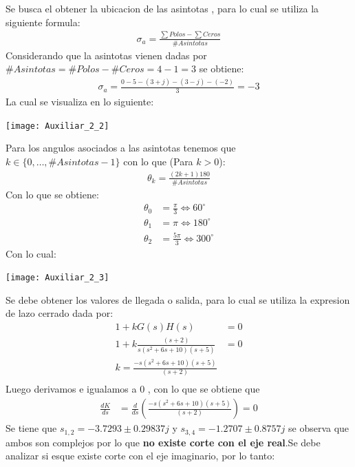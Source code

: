 \documentclass[
  11pt,
  letterpaper,
   addpoints,
  ]{exam}
\begin{document}
\begin{questions}
\begin{solution}
Se busca el obtener la ubicacion de las asintotas , para lo cual se utiliza la siguiente formula:
\begin{align}
    \sigma_{a}= \frac{\sum Polos - \sum Ceros}{\# Asintotas} 
\end{align}
Considerando que la asintotas vienen dadas por $\#Asintotas = \#Polos - \#Ceros = 4 - 1 = 3$ se obtiene:
\begin{align}
    \sigma_{a}= \frac{ 0 - 5 -(3 + j) - (3 - j) - (-2)}{3} = -3 
\end{align}
La cual se visualiza en lo siguiente:
\begin{center}
    \texttt{[image: Auxiliar\_2\_2]}
  \end{center}
Para los angulos asociados a las asintotas tenemos que $k \in \{0,\dots, \#Asintotas -1\}$ con lo que (Para $k>0$):
\begin{align}
    \theta_{k} = \frac{(2k+1)180}{\#Asintotas}
\end{align}
Con lo que se obtiene:
\begin{align}
    \theta_{0} &=  \frac{\pi}{3} \Leftrightarrow 60^{\circ} \\
    \theta_{1} &=  \pi \Leftrightarrow 180^{\circ} \\
    \theta_{2} &=  \frac{5\pi}{3} \Leftrightarrow 300^{\circ} 
\end{align}
Con lo cual:
\begin{center}
    \texttt{[image: Auxiliar\_2\_3]}
  \end{center}
Se debe obtener los valores de llegada o salida, para lo cual se utiliza la expresion de lazo cerrado dada por:
\begin{align}
    1+kG(s)H(s) &= 0\\
    1+ k\frac{(s+2)}{s(s^{2}+6s+10)(s+5)} &= 0\\
    k = \frac{-s(s^{2}+6s+10)(s+5)}{(s+2)}\\
\end{align}
Luego derivamos e igualamos a 0 , con lo que se obtiene que 
\begin{align}
    \frac{dK}{ds} &= \frac{d}{ds} \left( \frac{-s(s^{2}+6s+10)(s+5)}{(s+2)} \right) = 0
\end{align}
Se tiene que $s_{1,2}= -3.7293 \pm 0.29837j$ y $s_{3,4}=-1.2707 \pm 0.8757j$ se observa que ambos son complejos por lo que \textbf{no existe corte con el eje real}.Se debe analizar si esque existe corte con el eje imaginario, por lo tanto:

\end{solution}
\end{questions}
\end{document}
